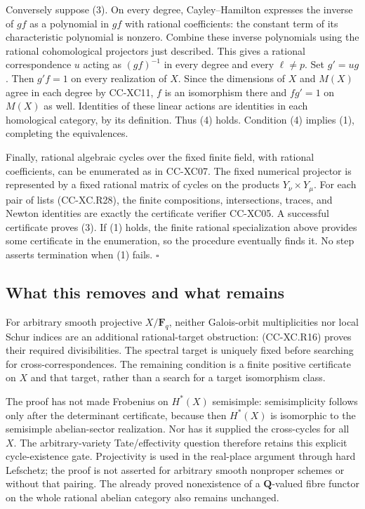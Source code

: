 Conversely suppose (3). On every degree, Cayley--Hamilton expresses the
inverse of \(gf\) as a polynomial in \(gf\) with rational coefficients:
the constant term of its characteristic polynomial is nonzero. Combine
these inverse polynomials using the rational cohomological projectors
just described. This gives a rational correspondence \(u\) acting as
\((gf)^{-1}\) in every degree and every \(\ell\ne p\). Set \(g'=ug\).
Then \(g'f=1\) on every realization of \(X\). Since the dimensions of
\(X\) and \(M(X)\) agree in each degree by CC-XC11, \(f\) is an
isomorphism there and \(fg'=1\) on \(M(X)\) as well. Identities of these
linear actions are identities in each homological category, by its
definition. Thus (4) holds. Condition (4) implies (1), completing the
equivalences.

Finally, rational algebraic cycles over the fixed finite field, with
rational coefficients, can be enumerated as in CC-XC07. The fixed
numerical projector is represented by a fixed rational matrix of cycles
on the products \(Y_\nu\times Y_\mu\). For each pair of lists
(CC-XC.R28), the finite compositions, intersections, traces, and Newton
identities are exactly the certificate verifier CC-XC05. A successful
certificate proves (3). If (1) holds, the finite rational specialization
above provides some certificate in the enumeration, so the procedure
eventually finds it. No step asserts termination when (1) fails.
\(\square\)

\subsection{What this removes and what
remains}\label{what-this-removes-and-what-remains}

For arbitrary smooth projective \(X/\mathbf F_q\), neither Galois-orbit
multiplicities nor local Schur indices are an additional rational-target
obstruction: (CC-XC.R16) proves their required divisibilities. The
spectral target is uniquely fixed before searching for
cross-correspondences. The remaining condition is a finite positive
certificate on \(X\) and that target, rather than a search for a target
isomorphism class.

The proof has not made Frobenius on \(H^*(X)\) semisimple:
semisimplicity follows only after the determinant certificate, because
then \(H^*(X)\) is isomorphic to the semisimple abelian-sector
realization. Nor has it supplied the cross-cycles for all \(X\). The
arbitrary-variety Tate/effectivity question therefore retains this
explicit cycle-existence gate. Projectivity is used in the real-place
argument through hard Lefschetz; the proof is not asserted for arbitrary
smooth nonproper schemes or without that pairing. The already proved
nonexistence of a \(\mathbf Q\)-valued fibre functor on the whole
rational abelian category also remains unchanged.

